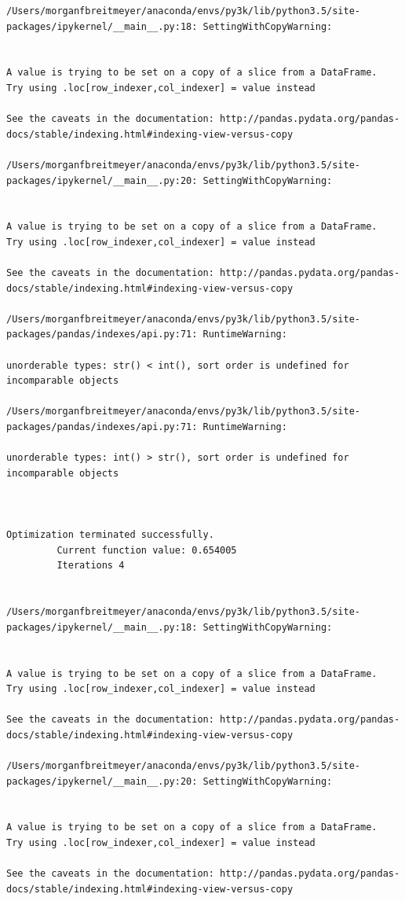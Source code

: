 \begin{lstlisting}
/Users/morganfbreitmeyer/anaconda/envs/py3k/lib/python3.5/site-packages/ipykernel/__main__.py:18: SettingWithCopyWarning:


A value is trying to be set on a copy of a slice from a DataFrame.
Try using .loc[row_indexer,col_indexer] = value instead

See the caveats in the documentation: http://pandas.pydata.org/pandas-docs/stable/indexing.html#indexing-view-versus-copy

/Users/morganfbreitmeyer/anaconda/envs/py3k/lib/python3.5/site-packages/ipykernel/__main__.py:20: SettingWithCopyWarning:


A value is trying to be set on a copy of a slice from a DataFrame.
Try using .loc[row_indexer,col_indexer] = value instead

See the caveats in the documentation: http://pandas.pydata.org/pandas-docs/stable/indexing.html#indexing-view-versus-copy

/Users/morganfbreitmeyer/anaconda/envs/py3k/lib/python3.5/site-packages/pandas/indexes/api.py:71: RuntimeWarning:

unorderable types: str() < int(), sort order is undefined for incomparable objects

/Users/morganfbreitmeyer/anaconda/envs/py3k/lib/python3.5/site-packages/pandas/indexes/api.py:71: RuntimeWarning:

unorderable types: int() > str(), sort order is undefined for incomparable objects



Optimization terminated successfully.
         Current function value: 0.654005
         Iterations 4


/Users/morganfbreitmeyer/anaconda/envs/py3k/lib/python3.5/site-packages/ipykernel/__main__.py:18: SettingWithCopyWarning:


A value is trying to be set on a copy of a slice from a DataFrame.
Try using .loc[row_indexer,col_indexer] = value instead

See the caveats in the documentation: http://pandas.pydata.org/pandas-docs/stable/indexing.html#indexing-view-versus-copy

/Users/morganfbreitmeyer/anaconda/envs/py3k/lib/python3.5/site-packages/ipykernel/__main__.py:20: SettingWithCopyWarning:


A value is trying to be set on a copy of a slice from a DataFrame.
Try using .loc[row_indexer,col_indexer] = value instead

See the caveats in the documentation: http://pandas.pydata.org/pandas-docs/stable/indexing.html#indexing-view-versus-copy


\end{lstlisting}
